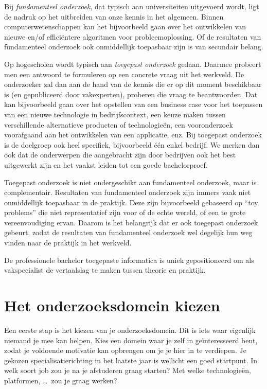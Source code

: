 Bij \emph{fundamenteel onderzoek}, dat typisch aan universiteiten uitgevoerd wordt, ligt de nadruk op het uitbreiden van onze kennis in het algemeen. Binnen computerwetenschappen kan het bijvoorbeeld gaan over het ontwikkelen van nieuwe en/of efficiëntere algoritmen voor probleemoplossing. Of de resultaten van fundamenteel onderzoek ook onmiddellijk toepasbaar zijn is van secundair belang.

Op hogescholen wordt typisch aan \emph{toegepast onderzoek} gedaan. Daarmee probeert men een antwoord te formuleren op een concrete vraag uit het werkveld. De onderzoeker zal dan aan de hand van de kennis die er op dit moment beschikbaar is (en gepubliceerd door vakexperten), proberen die vraag te beantwoorden. Dat kan bijvoorbeeld gaan over het opstellen van een business case voor het toepassen van een nieuwe technologie in bedrijfscontext, een keuze maken tussen verschillende alternatieve producten of technologieën, een vooronderzoek voorafgaand aan het ontwikkelen van een applicatie, enz. Bij toegepast onderzoek is de doelgroep ook heel specifiek, bijvoorbeeld één enkel bedrijf. We merken dan ook dat de onderwerpen die aangebracht zijn door bedrijven ook het best uitgewerkt zijn en het vaakst leiden tot een goede bachelorproef.

Toegepast onderzoek is niet ondergeschikt aan fundamenteel onderzoek, maar is complementair. Resultaten van fundamenteel onderzoek zijn immers vaak niet onmiddellijk toepasbaar in de praktijk. Deze zijn bijvoorbeeld gebaseerd op ``toy problems'' die niet representatief zijn voor of de echte wereld, of een te grote vereenvoudiging ervan. Daarom is het belangrijk dat er ook toegepast onderzoek gebeurt, zodat de resultaten van fundamenteel onderzoek wel degelijk hun weg vinden naar de praktijk in het werkveld.

De professionele bachelor toegepaste informatica is uniek gepositioneerd om als vakspecialist de vertaalslag te maken tussen theorie en praktijk.

\section{Het onderzoeksdomein kiezen}%
\label{sec:het_onderzoeksdomein_kiezen}

Een eerste stap is het kiezen van je onderzoeksdomein. Dit is iets waar eigenlijk niemand je mee kan helpen. Kies een domein waar je zelf in geïnteresseerd bent, zodat je voldoende motivatie kan opbrengen om je je hier in te verdiepen. Je gekozen specialisatierichting in het laatste jaar is wellicht een goed startpunt. In welk soort job zou je na je afstuderen graag starten? Met welke technologieën, platformen, \ldots\ zou je graag werken?

